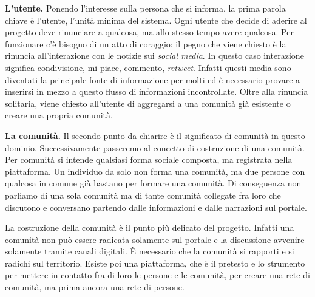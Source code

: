 \documentclass{article}
\begin{document}
\vspace{0.5 cm}

\textbf{L’utente.} Ponendo l’interesse sulla persona che si informa, la prima parola chiave è l’utente, l’unità minima del sistema. Ogni utente che decide di aderire al progetto deve rinunciare a qualcosa, ma allo stesso tempo avere qualcosa. Per funzionare c’è bisogno di un atto di coraggio: il pegno che viene chiesto è la rinuncia all’interazione con le notizie sui \textit{social media}. In questo caso interazione significa condivisione, mi piace, commento, \textit{retweet}. Infatti questi media sono diventati la principale fonte di informazione per molti ed è necessario provare a inserirsi in mezzo a questo flusso di informazioni incontrollate. Oltre alla rinuncia solitaria, viene chiesto all’utente di aggregarsi a una comunità già esistente o creare una propria comunità.

\vspace{0.5 cm}

\textbf{La comunità.} Il secondo punto da chiarire è il significato di comunità in questo dominio. Successivamente passeremo al concetto di costruzione di una comunità. Per comunità si intende qualsiasi forma sociale composta, ma registrata nella piattaforma. Un individuo da solo non forma una comunità, ma due persone con qualcosa in comune già bastano per formare una comunità. Di conseguenza non parliamo di una sola comunità ma di tante comunità collegate fra loro che discutono e conversano partendo dalle informazioni e dalle narrazioni sul portale.

La costruzione della comunità è il punto più delicato del progetto. Infatti una comunità non può essere radicata solamente sul portale e la discussione avvenire solamente tramite canali digitali. È necessario che la comunità si rapporti e si radichi sul territorio. Esiste poi una piattaforma, che è il pretesto e lo strumento per mettere in contatto fra di loro le persone e le comunità, per creare una rete di comunità, ma prima ancora una rete di persone.

\vspace{0.5 cm}
\end{document}
